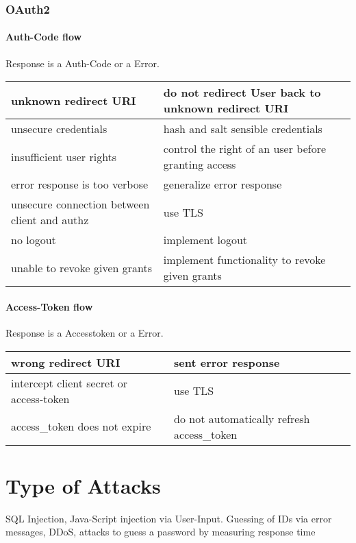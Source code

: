 \subsubsection{OAuth2}

\paragraph{Auth-Code flow}

Response is a Auth-Code or a Error.

\begin{tabular}{|l|l|}
    \hline
    unknown redirect URI & do not redirect User back to unknown redirect URI\\
    \hline
    unsecure credentials & hash and salt sensible credentials \\
    \hline
    insufficient user rights & control the right of an user before granting access \\
    \hline
    error response is too verbose & generalize error response \\
    \hline
    unsecure connection between client and authz & use TLS \\
    \hline
    no logout & implement logout \\
    \hline
    unable to revoke given grants & implement functionality to revoke given grants \\
    \hline
 \end{tabular}

\paragraph{Access-Token flow}

Response is a Accesstoken or a Error.

\begin{tabular}{|l|l|}
    \hline
    wrong redirect URI & sent error response\\
    \hline
    intercept client secret or access-token & use TLS \\
    \hline
    access\_token does not expire & do not automatically refresh access\_token \\
    \hline
 \end{tabular}

\section{Type of Attacks}
SQL Injection, Java-Script injection via User-Input.
Guessing of IDs via error messages, DDoS, 
attacks to guess a password by measuring response time
